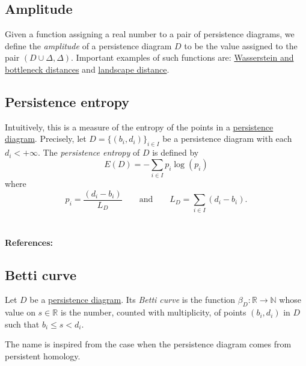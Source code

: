 \documentclass{amsart}
\begin{document}
	\subsection*{Amplitude} \label{amplitude}
	
	Given a function assigning a real number to a pair of persistence diagrams, we define the \textit{amplitude} of a persistence diagram $D$ to be the value assigned to the pair $(D \cup \Delta, \Delta)$. Important examples of such functions are: \hyperref[wasserstein and bottleneck distance]{Wasserstein and bottleneck distances} and \hyperref[persistence landscape norm]{landscape distance}.
	
	\subsection*{Persistence entropy} \label{persistence entropy}
	
	Intuitively, this is a measure of the entropy of the points in a \hyperref[persistence diagram]{persistence diagram}. Precisely, let $D = \{(b_i, d_i)\}_{i \in I}$ be a persistence diagram with each $d_i < +\infty$. The \textit{persistence entropy} of $D$ is defined by
	\begin{equation*}
	E(D) = - \sum_{i \in I} p_i \log(p_i)
	\end{equation*}
	where
	\begin{equation*}
	p_i = \frac{(d_i - b_i)}{L_D} \qquad \text{and} \qquad L_D = \sum_{i \in I} (d_i - b_i) . 
	\end{equation*}
	
	\paragraph{\\ References:} \cite{rucco2016characterisation}
	
	\subsection*{Betti curve} \label{betti curve}
	
	Let $D$ be a \hyperref[persistence diagram]{persistence diagram}. Its \textit{Betti curve} is the function $\beta_D : \mathbb R \to \mathbb N$ whose value on $s \in \mathbb R$ is the number, counted with multiplicity, of points $(b_i,d_i)$ in $D$ such that $b_i \leq s <d_i$.
	
	The name is inspired from the case when the persistence diagram comes from persistent homology.
	
\end{document}
